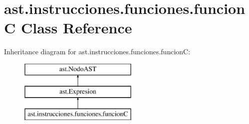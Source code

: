\hypertarget{classast_1_1instrucciones_1_1funciones_1_1funcion_c}{}\section{ast.\+instrucciones.\+funciones.\+funcionC Class Reference}
\label{classast_1_1instrucciones_1_1funciones_1_1funcion_c}
Inheritance diagram for ast.\+instrucciones.\+funciones.\+funcionC\+:\begin{figure}[H]
\begin{center}
\leavevmode
\includegraphics[height=3.000000cm]{classast_1_1instrucciones_1_1funciones_1_1funcion_c}
\end{center}
\end{figure}

